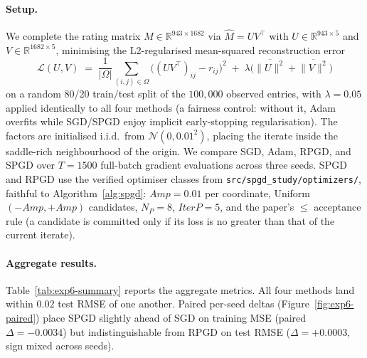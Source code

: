 \documentclass[11pt]{article}
\newcommand{\np}{\ensuremath{N_P}}
\newcommand{\iterp}{\ensuremath{\textit{IterP}}}
\newcommand{\amp}{\ensuremath{\textit{Amp}}}
\begin{document}
\paragraph{Setup.}  We complete the rating matrix
$M \in \mathbb{R}^{943 \times 1682}$ via $\widehat{M} = U V^{\top}$
with $U \in \mathbb{R}^{943 \times 5}$ and
$V \in \mathbb{R}^{1682 \times 5}$, minimising the L2-regularised
mean-squared reconstruction error
\begin{equation*}
  \mathcal{L}(U, V) \;=\;
    \frac{1}{|\Omega|} \sum_{(i,j) \in \Omega}
      \bigl( (UV^{\top})_{ij} - r_{ij} \bigr)^{2}
    \;+\; \lambda
      \bigl( \overline{\|U\|^2} + \overline{\|V\|^2} \bigr)
\end{equation*}
on a random 80/20 train/test split of the $100{,}000$ observed
entries, with $\lambda = 0.05$ applied identically to all four
methods (a fairness control: without it, Adam overfits while
SGD/SPGD enjoy implicit early-stopping regularisation).  The factors
are initialised i.i.d.\ from $\mathcal{N}(0, 0.01^2)$, placing the
iterate inside the saddle-rich neighbourhood of the origin.  We
compare SGD, Adam, RPGD, and SPGD over $T{=}1500$ full-batch gradient
evaluations across three seeds.  SPGD and RPGD use the verified
optimiser classes from \texttt{src/spgd\_study/optimizers/},
faithful to Algorithm~\ref{alg:spgd}: $\amp = 0.01$ per coordinate,
Uniform$(-\amp, +\amp)$ candidates, $\np{=}8$, $\iterp{=}5$, and the
paper's $\le$ acceptance rule (a candidate is committed only if its
loss is no greater than that of the current iterate).

\paragraph{Aggregate results.}  Table~\ref{tab:exp6-summary} reports
the aggregate metrics.  All four methods land within $0.02$ test
RMSE of one another.  Paired per-seed deltas
(Figure~\ref{fig:exp6-paired}) place SPGD slightly ahead of SGD on
training MSE (paired $\Delta = -0.0034$) but indistinguishable from
RPGD on test RMSE ($\Delta = +0.0003$, sign mixed across seeds).
\end{document}
